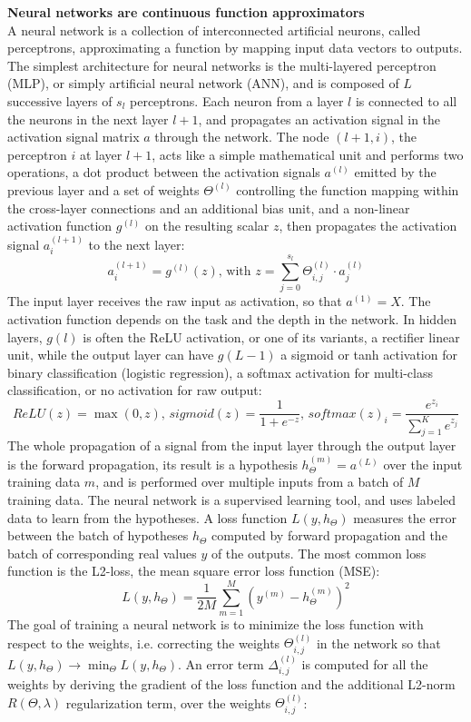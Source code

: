 \textbf{Neural networks are continuous function approximators} \\
A neural network is a collection of interconnected artificial neurons, called perceptrons, approximating a function by mapping input data vectors to outputs. The simplest architecture for neural networks is the multi-layered perceptron (MLP), or simply artificial neural network (ANN), and is composed of $L$ successive layers of $s_l$ perceptrons. Each neuron from a layer $l$ is connected to all the neurons in the next layer $l+1$, and propagates an activation signal in the activation signal matrix $a$ through the network. The node $(l+1,i)$, the perceptron $i$ at layer $l+1$, acts like a simple mathematical unit and performs two operations, a dot product between the activation signals $a^{(l)}$ emitted by the previous layer and a set of weights $\Theta^{(l)}$ controlling the function mapping within the cross-layer connections and an additional bias unit, and a non-linear activation function $g^{(l)}$ on the resulting scalar $z$, then propagates the activation signal $a^{(l+1)}_i$ to the next layer: 
\[ a^{(l+1)}_i = g^{(l)}(z) \text{, with } z = \sum_{j=0}^{s_{l}} \Theta^{(l)}_{i,j} \cdot a^{(l)}_{j} \]
The input layer receives the raw input as activation, so that $a^{(1)} = X$. The activation function depends on the task and the depth in the network. In hidden layers, $g(l)$ is often the ReLU activation, or one of its variants, a rectifier linear unit, while the output layer can have $g(L-1)$ a sigmoid or tanh activation for binary classification (logistic regression), a softmax activation for multi-class classification, or no activation for raw output:
\[ ReLU(z) = \max(0,z) \text{, } sigmoid(z) = \frac{1}{1+e^{-z}}  \text{, } softmax(z)_i = \frac{e^{z_i}}{\sum_{j=1}^K e^{z_j}} \]
The whole propagation of a signal from the input layer through the output layer is the forward propagation, its result is a hypothesis $h_{\Theta}^{(m)} = a^{(L)}$ over the input training data $m$, and is performed over multiple inputs from a batch of $M$ training data. The neural network is a supervised learning tool, and uses labeled data to learn from the hypotheses. A loss function $L(y,h_{\Theta})$ measures the error between the batch of hypotheses $h_{\Theta}$ computed by forward propagation and the batch of corresponding real values $y$ of the outputs. The most common loss function is the L2-loss, the mean square error loss function (MSE):
\[ L(y,h_{\Theta}) = \frac{1}{2M}\sum_{m=1}^M (y^{(m)} - h_{\Theta}^{(m)})^2 \]
The goal of training a neural network is to minimize the loss function with respect to the weights, i.e. correcting the weights $\Theta_{i,j}^{(l)}$ in the network so that $L(y,h_{\Theta}) \rightarrow \min_{\Theta} L(y,h_{\Theta})$. An error term $\Delta_{i,j}^{(l)}$ is computed for all the weights by deriving the gradient of the loss function and the additional L2-norm $R(\Theta, \lambda)$ regularization term, over the weights $\Theta_{i,j}^{(l)}$:

